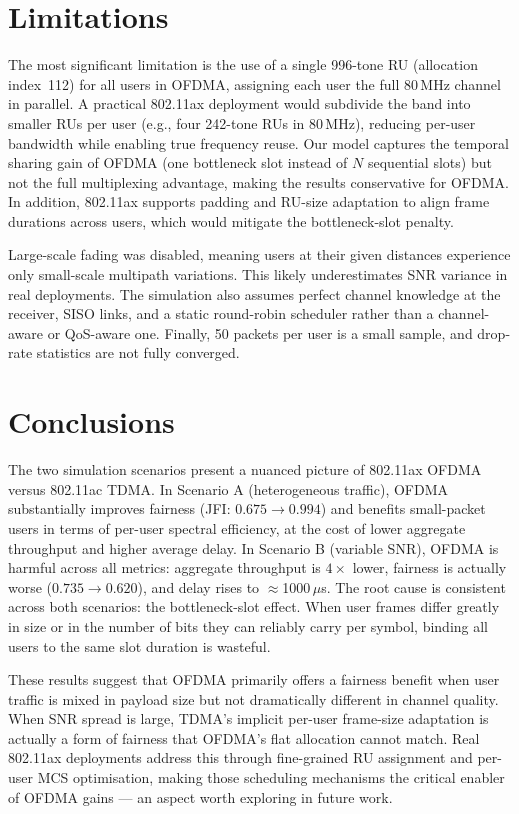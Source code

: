 \documentclass[twocolumn]{article}
\begin{document}
\section{Limitations}

The most significant limitation is the use of a single 996-tone RU (allocation index~112) for all users in OFDMA, assigning each user the full 80\,MHz channel in parallel. A practical 802.11ax deployment would subdivide the band into smaller RUs per user (e.g., four 242-tone RUs in 80\,MHz), reducing per-user bandwidth while enabling true frequency reuse. Our model captures the temporal sharing gain of OFDMA (one bottleneck slot instead of $N$ sequential slots) but not the full multiplexing advantage, making the results conservative for OFDMA. In addition, 802.11ax supports padding and RU-size adaptation to align frame durations across users, which would mitigate the bottleneck-slot penalty.

Large-scale fading was disabled, meaning users at their given distances experience only small-scale multipath variations. This likely underestimates SNR variance in real deployments. The simulation also assumes perfect channel knowledge at the receiver, SISO links, and a static round-robin scheduler rather than a channel-aware or QoS-aware one. Finally, 50 packets per user is a small sample, and drop-rate statistics are not fully converged.

\section{Conclusions}

The two simulation scenarios present a nuanced picture of 802.11ax OFDMA versus 802.11ac TDMA. In Scenario A (heterogeneous traffic), OFDMA substantially improves fairness (JFI: $0.675 \to 0.994$) and benefits small-packet users in terms of per-user spectral efficiency, at the cost of lower aggregate throughput and higher average delay. In Scenario B (variable SNR), OFDMA is harmful across all metrics: aggregate throughput is $4\times$ lower, fairness is actually worse ($0.735 \to 0.620$), and delay rises to $\approx$1000\,$\mu$s. The root cause is consistent across both scenarios: the bottleneck-slot effect. When user frames differ greatly in size or in the number of bits they can reliably carry per symbol, binding all users to the same slot duration is wasteful.

These results suggest that OFDMA primarily offers a fairness benefit when user traffic is mixed in payload size but not dramatically different in channel quality. When SNR spread is large, TDMA's implicit per-user frame-size adaptation is actually a form of fairness that OFDMA's flat allocation cannot match. Real 802.11ax deployments address this through fine-grained RU assignment and per-user MCS optimisation, making those scheduling mechanisms the critical enabler of OFDMA gains — an aspect worth exploring in future work.
\end{document}
